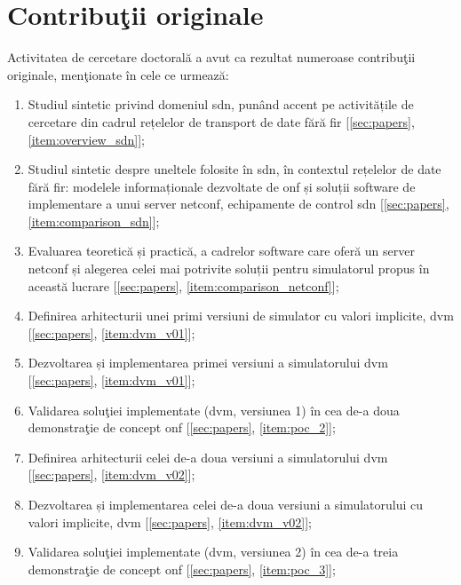 \section{Contribuţii originale}

Activitatea de cercetare doctorală a avut ca rezultat numeroase contribuţii originale, menţionate în cele ce urmează:
\begin{enumerate}
	\item Studiul sintetic privind domeniul \gls{sdn}, punând accent pe activitățile de cercetare din cadrul rețelelor de transport de date fără fir [\ref{sec:papers}, \ref{item:overview_sdn}];
	
	\item Studiul sintetic despre uneltele folosite în \gls{sdn}, în contextul rețelelor de date fără fir: modelele informaționale dezvoltate de \gls{onf} și soluții software de implementare a unui server \gls{netconf}, echipamente de control \gls{sdn} [\ref{sec:papers}, \ref{item:comparison_sdn}];
	
	\item Evaluarea teoretică și practică, a cadrelor software care oferă un server \gls{netconf} și alegerea celei mai potrivite soluții pentru simulatorul propus în această lucrare [\ref{sec:papers}, \ref{item:comparison_netconf}];
	
	\item Definirea arhitecturii unei primi versiuni de simulator cu valori implicite, \gls{dvm} [\ref{sec:papers}, \ref{item:dvm_v01}];
	
	\item Dezvoltarea și implementarea primei versiuni a simulatorului \gls{dvm} [\ref{sec:papers}, \ref{item:dvm_v01}];
	
	\item Validarea soluţiei implementate (\gls{dvm}, versiunea 1) în cea de-a doua demonstraţie de concept \gls{onf} [\ref{sec:papers}, \ref{item:poc_2}];
	
	\item Definirea arhitecturii celei de-a doua versiuni a simulatorului \gls{dvm} [\ref{sec:papers}, \ref{item:dvm_v02}];
	
	\item Dezvoltarea și implementarea celei de-a doua versiuni a simulatorului cu valori implicite, \gls{dvm} [\ref{sec:papers}, \ref{item:dvm_v02}];
	
	\item Validarea soluţiei implementate (\gls{dvm}, versiunea 2) în cea de-a treia demonstraţie de concept \gls{onf} [\ref{sec:papers}, \ref{item:poc_3}];
	

\end{enumerate}
